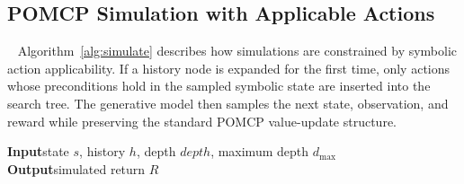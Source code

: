 \subsection{POMCP Simulation with Applicable Actions}~\label{appx:alg_simulate}
Algorithm~\ref{alg:simulate} describes how simulations are constrained by symbolic action applicability. If a history node is expanded for the first time, only actions whose preconditions hold in the sampled symbolic state are inserted into the search tree. The generative model then samples the next state, observation, and reward while preserving the standard POMCP value-update structure.

\begin{algorithm}[H]
\caption{POMCP Simulation with Applicable Actions}
\label{alg:simulate}
\textbf{Input}\quad state $s$, history $h$, depth $depth$, maximum depth $d_{\max}$ \\
\textbf{Output}\quad simulated return $R$
\BlankLine

\end{algorithm}

